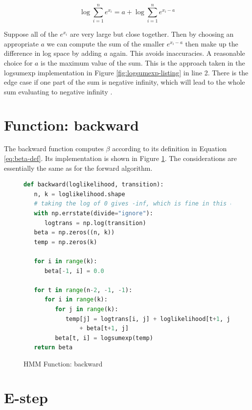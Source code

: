 \begin{equation}
\log \sum_{i=1}^{n} e^{x_{i}}=a+\log \sum_{i=1}^{n} e^{x_{i}-a}
\end{equation}

Suppose all of the $e^{x_i}$ are very large but close together. Then by choosing an appropriate $a$ we can compute the sum of the smaller $e^{x_i-a}$ then make up the difference in log space by adding $a$ again. This avoids inaccuracies. A reasonable choice for $a$ is the maximum value of the sum. This is the approach taken in the logsumexp implementation in Figure \ref{fig:logsumexp-listing} in line 2. There is the edge case if one part of the sum is negative infinity, which will lead to the whole sum evaluating to negative infinity \parencite{mllecture}.


\section{Function: backward}

The backward function computes $\beta$ according to its definition in Equation \ref{eq:beta-def}. Its implementation is shown in Figure \ref{fig:hmm-backwards-listing}. The considerations are essentially the same as for the forward algorithm. 

\begin{figure}
\begin{singlespace}
\begin{lstlisting}[language=Python]
def backward(loglikelihood, transition):
   n, k = loglikelihood.shape
   # taking the log of 0 gives -inf, which is fine in this case
   with np.errstate(divide="ignore"):
      logtrans = np.log(transition)
   beta = np.zeros((n, k))
   temp = np.zeros(k)

   for i in range(k):
      beta[-1, i] = 0.0

   for t in range(n-2, -1, -1):
      for i in range(k):
         for j in range(k):
            temp[j] = logtrans[i, j] + loglikelihood[t+1, j] \
                + beta[t+1, j]
         beta[t, i] = logsumexp(temp)
   return beta
\end{lstlisting}
\end{singlespace}
\caption{HMM Function: backward}    
\label{fig:hmm-backwards-listing}
\end{figure}

\section{E-step}

